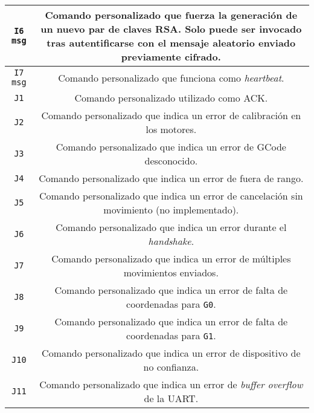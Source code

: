 \begin{longtable}{| C{0.5} | C{1} |}
    \hline
    \texttt{I6 msg} & Comando personalizado que fuerza la generación de un nuevo par de claves RSA. Solo puede ser invocado tras autentificarse con el mensaje aleatorio enviado previamente cifrado. \\
    \hline
    \texttt{I7 msg} & Comando personalizado que funciona como \textit{heartbeat}. \\
    \hline
    \texttt{J1} & Comando personalizado utilizado como ACK. \\
    \hline
    \texttt{J2} & Comando personalizado que indica un error de calibración en los motores. \\
    \hline
    \texttt{J3} & Comando personalizado que indica un error de GCode desconocido. \\
    \hline
    \texttt{J4} & Comando personalizado que indica un error de fuera de rango. \\
    \hline
    \texttt{J5} & Comando personalizado que indica un error de cancelación sin movimiento (no implementado). \\
    \hline
    \texttt{J6} & Comando personalizado que indica un error durante el \textit{handshake}. \\
    \hline
    \texttt{J7} & Comando personalizado que indica un error de múltiples movimientos enviados. \\
    \hline
    \texttt{J8} & Comando personalizado que indica un error de falta de coordenadas para \texttt{G0}. \\
    \hline
    \texttt{J9} & Comando personalizado que indica un error de falta de coordenadas para \texttt{G1}. \\
    \hline
    \texttt{J10} & Comando personalizado que indica un error de dispositivo de no confianza. \\
    \hline
    \texttt{J11} & Comando personalizado que indica un error de \textit{buffer overflow} de la \ac{UART}. \\
    \hline
\end{longtable}